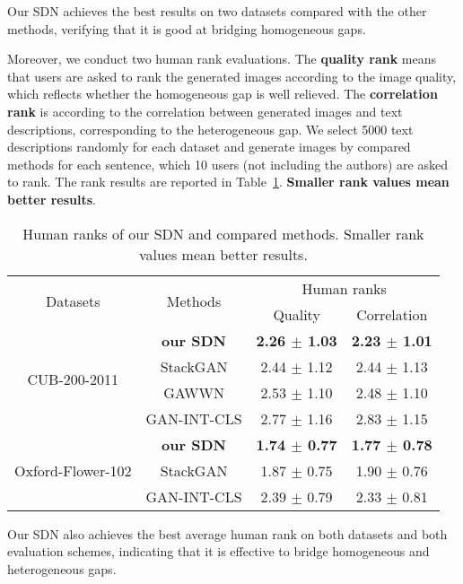 \documentclass[sigconf]{acmart}
\begin{document}
Our SDN achieves the best results on two datasets compared with the other methods, verifying that it is good at bridging homogeneous gaps.

Moreover, we conduct two human rank evaluations. The \textbf{quality rank} means that users are asked to rank the generated images according to the image quality, which reflects whether the homogeneous gap is well relieved. The \textbf{correlation rank} is according to the correlation between generated images and text descriptions, corresponding to the heterogeneous gap. We select 5000 text descriptions randomly for each dataset and generate images by compared methods for each sentence, which 10 users (not including the authors) are asked to rank. The rank results are reported in Table~\ref{table:Human}. \textbf{Smaller rank values mean better results}.

\begin{table}[htb]
	\caption{Human ranks of our SDN and compared methods. Smaller rank values mean better results.}
	\begin{center}
		\begin{tabular}{|c|c|c|c|}
			\hline
			\multirow{2}{*}{Datasets} & \multirow{2}{*}{Methods} & \multicolumn{2}{|c|}{Human ranks} \\
			\cline{3-4}
			& & Quality & Correlation \\
			\hline
			\multirow{4}{1.5cm}{CUB-200-2011} & \textbf{our SDN} & \textbf{2.26 $\pm$ 1.03} & \textbf{2.23 $\pm$ 1.01} \\
			& StackGAN & 2.44 $\pm$ 1.12 & 2.44 $\pm$ 1.13 \\
			& GAWWN & 2.53 $\pm$ 1.10 & 2.48 $\pm$ 1.10 \\
			& GAN-INT-CLS & 2.77 $\pm$ 1.16 & 2.83 $\pm$ 1.15 \\
			\hline
			
			\multirow{3}{1.5cm}{Oxford-Flower-102} & \textbf{our SDN} & \textbf{1.74 $\pm$ 0.77} & \textbf{1.77 $\pm$ 0.78}  \\
			& StackGAN & 1.87 $\pm$ 0.75 & 1.90 $\pm$ 0.76 \\
			& GAN-INT-CLS & 2.39 $\pm$ 0.79 & 2.33 $\pm$ 0.81 \\
			\hline
		\end{tabular} 
	\end{center}
	\label{table:Human}
\end{table}

Our SDN also achieves the best average human rank on both datasets and both evaluation schemes, indicating that it is effective to bridge homogeneous and heterogeneous gaps. 
\end{document}
